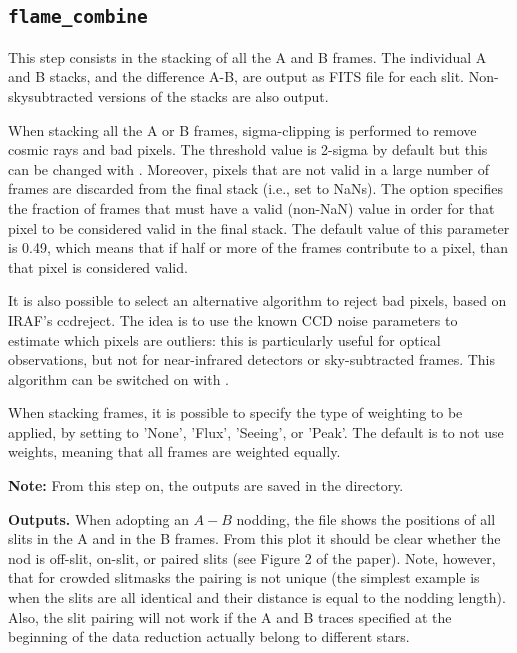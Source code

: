 \documentclass[a4paper]{article}
\begin{document}
\begin{sloppypar}
\subsection{\texttt{flame\_combine}}
\label{sec:combine}

This step consists in the stacking of all the A and B frames. The individual A and B stacks, and the difference A-B, are output as FITS file for each slit. Non-skysubtracted versions of the stacks are also output.

When stacking all the A or B frames, sigma-clipping is performed to remove cosmic rays and bad pixels. The threshold value is 2-sigma by default but this can be changed with . Moreover, pixels that are not valid in a large number of frames are discarded from the final stack (i.e., set to NaNs). The  option specifies the fraction of frames that must have a valid (non-NaN) value in order for that pixel to be considered valid in the final stack. The default value of this parameter is 0.49, which means that if half or more of the frames contribute to a pixel, than that pixel is considered valid.

It is also possible to select an alternative algorithm to reject bad pixels, based on IRAF's ccdreject. The idea is to use the known CCD noise parameters to estimate which pixels are outliers: this is particularly useful for optical observations, but not for near-infrared detectors or sky-subtracted frames. This algorithm can be switched on with .

When stacking frames, it is possible to specify the type of weighting to be applied, by setting  to 'None', 'Flux', 'Seeing', or 'Peak'. The default is to not use weights, meaning that all frames are weighted equally.

\medskip
\noindent
\textbf{Note:} From this step on, the outputs are saved in the  directory.

\medskip
\noindent
\textbf{Outputs.} When adopting an $A-B$ nodding, the file  shows the positions of all slits in the A and in the B frames. From this plot it should be clear whether the nod is off-slit, on-slit, or paired slits (see Figure 2 of the paper). Note, however, that for crowded slitmasks the pairing is not unique (the simplest example is when the slits are all identical and their distance is equal to the nodding length). Also, the slit pairing will not work if the A and B traces specified at the beginning of the data reduction actually belong to different stars.


\end{sloppypar}
\end{document}
